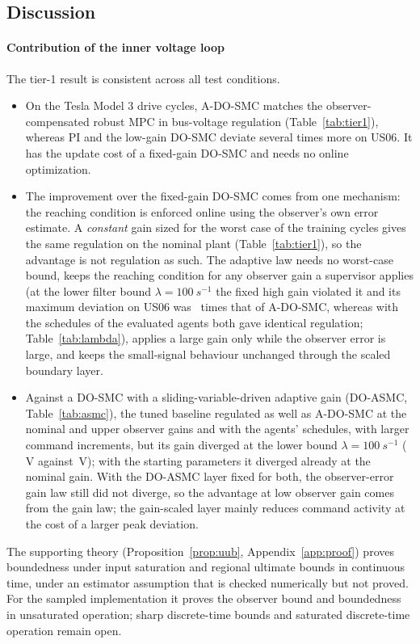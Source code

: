 \subsection{Discussion}\label{sec:discussion}

\paragraph{Contribution of the inner voltage loop}
The tier-1 result is consistent across all test conditions.
\begin{itemize}
\item On the Tesla Model 3 drive cycles, A-DO-SMC matches the observer-compensated robust MPC in bus-voltage regulation (Table~\ref{tab:tier1}), whereas PI and the low-gain DO-SMC deviate several times more on US06. It has the update cost of a fixed-gain DO-SMC and needs no online optimization.
\item The improvement over the fixed-gain DO-SMC comes from one mechanism: the reaching condition is enforced online using the observer's own error estimate. A \emph{constant} gain sized for the worst case of the training cycles gives the same regulation on the nominal plant (Table~\ref{tab:tier1}), so the advantage is not regulation as such. The adaptive law needs no worst-case bound, keeps the reaching condition for any observer gain a supervisor applies (at the lower filter bound $\lambda=\SI{100}{s^{-1}}$ the fixed high gain violated it and its maximum deviation on US06 was \LamFactorHi\ times that of A-DO-SMC, whereas with the schedules of the evaluated agents both gave identical regulation; Table~\ref{tab:lambda}), applies a large gain only while the observer error is large, and keeps the small-signal behaviour unchanged through the scaled boundary layer.
\item Against a DO-SMC with a sliding-variable-driven adaptive gain (DO-ASMC, Table~\ref{tab:asmc}), the tuned baseline regulated as well as A-DO-SMC at the nominal and upper observer gains and with the agents' schedules, with larger command increments, but its gain diverged at the lower bound $\lambda=\SI{100}{s^{-1}}$ (\CmpAsLMax\,V against \CmpALMax\,V); with the starting parameters it diverged already at the nominal gain. With the DO-ASMC layer fixed for both, the observer-error gain law still did not diverge, so the advantage at low observer gain comes from the gain law; the gain-scaled layer mainly reduces command activity at the cost of a larger peak deviation.
\end{itemize}
The supporting theory (Proposition~\ref{prop:uub}, Appendix~\ref{app:proof}) proves boundedness under input saturation and regional ultimate bounds in continuous time, under an estimator assumption that is checked numerically but not proved. For the sampled implementation it proves the observer bound and boundedness in unsaturated operation; sharp discrete-time bounds and saturated discrete-time operation remain open.

